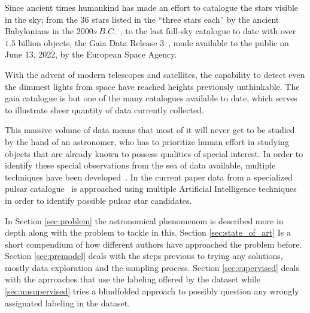 Since ancient times humankind has made an effort to catalogue the stars visible
in the sky; from the $36$ stars listed in the ``three stars each'' by the
ancient Babylonians in the $2000s\ B.C.$~\cite{astronomy:history:north}, to the
last full-sky catalogue to date with over $1.5$ billion objects, the Gaia Data
Release 3~\cite{gaia:dr3:esa}, made available to the public on June 13, 2022, by
the European Space Agency.

With the advent of modern telescopes and satellites, the capability to detect
even the dimmest lights from space have reached heights previously unthinkable.
The gaia catalogue is but one of the many catalogues available to date, which
serves to illustrate sheer quantity of data currently collected. 

This massive volume of data means that most of it will never get to be studied
by the hand of an astronomer, who has to prioritize human effort in
studying objects that are already known to possess qualities of special interest.
In order to identify these special observations from the sea of data available,
multiple techniques have been developed~\cite{pulsar:dataset:explanation:lyon}.
In the current paper data from a specialized pulsar
catalogue~\cite{pulsar:dataset:lyon} is approached using multiple Artificial
Intelligence techniques in order to identify possible pulsar star candidates.

In Section \ref{sec:problem} the astronomical phenomenom is described more in
depth along with the problem to tackle in this. Section \ref{sec:state_of_art}
Is a short compendium of how different authors have approached the problem
before. Section \ref{sec:premodel} deals with the steps previous to trying any
solutions, mostly data exploration and the sampling process. Section
\ref{sec:supervised} deals with the aprroaches that use the labeling offered
by the dataset while \ref{sec:unsupervised} tries a blindfolded approach to
possibly question any wrongly assignated labeling in the dataset.